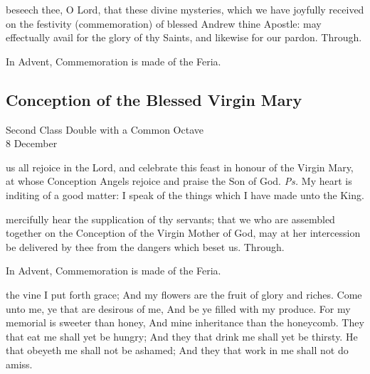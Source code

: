 \postcommunion
{} beseech thee, O Lord, that these divine mysteries, which we have joyfully received on the festivity (commemoration) of blessed Andrew thine Apostle: may effectually avail for the glory of thy Saints, and likewise for our pardon. Through.
\begin{rubric}
    In Advent, Commemoration is made of the Feria.
\end{rubric}


\clearpage
\subsection{Conception of the Blessed Virgin Mary}
\begin{inhead}
    {Second Class Double with a Common Octave\\
8 December}
\end{inhead}

\introit
{} us all rejoice in the Lord, and celebrate this feast in honour of the Virgin Mary, at whose Conception Angels rejoice and praise the Son of God. \textit{Ps.} My heart is inditing of a good matter: I speak of the things which I have made unto the King.

\collect
{} mercifully hear the supplication of thy servants; that we who are assembled together on the Conception of the Virgin Mother of God, may at her intercession be delivered by thee from the dangers which beset us. Through.
\begin{rubric}
    In Advent, Commemoration is made of the Feria.
\end{rubric}

 the vine I put forth grace; And my flowers are the fruit of glory and riches. Come unto me, ye that are desirous of me, And be ye filled with my produce. For my memorial is sweeter than honey, And mine inheritance than the honeycomb. They that eat me shall yet be hungry; And they that drink me shall yet be thirsty. He that obeyeth me shall not be ashamed; And they that work in me shall not do amiss. 

